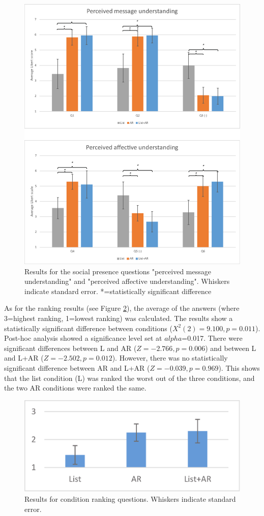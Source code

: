 \begin{figure}[H]
  \centering
  \includegraphics[width=.8\linewidth]{images/mgia16/social-presence.eps}
  \caption{Results for the social presence questions "perceived message understanding" and "perceived affective understanding". Whiskers indicate standard error. *=statistically significant difference}
    \label{fig:mgia16:social_presence}
\end{figure}

As for the ranking results (see Figure \ref{fig:mgia16:ranking}), the average of the answers (where 3=highest ranking, 1=lowest ranking) was calculated. The results show a statistically significant difference between conditions ($X^2(2)=9.100, p=0.011$). Post-hoc analysis showed a significance level set at $alpha$=0.017. There were significant differences between L and AR ($Z=-2.766, p=0.006$) and between L and L+AR ($Z=-2.502, p=0.012$). However, there was no statistically significant difference between AR and L+AR ($Z=-0.039, p=0.969$). This shows that the list condition (L) was ranked the worst out of the three conditions, and the two AR conditions were ranked the same.

\begin{figure}[H]
  \centering
  \includegraphics[width=.5\linewidth]{images/mgia16/ranking.eps}
  \caption{Results for condition ranking questions. Whiskers indicate standard error.}
    \label{fig:mgia16:ranking}
\end{figure}

